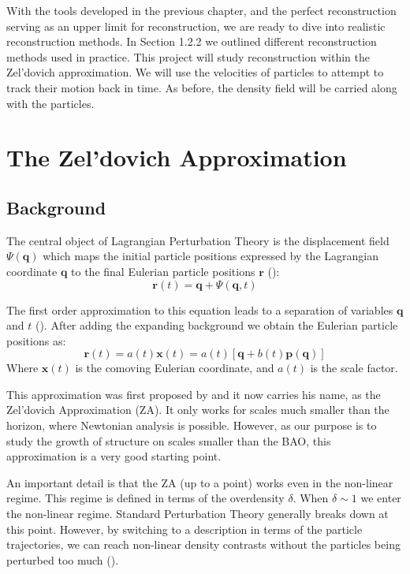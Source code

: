 
With the tools developed in the previous chapter, and the perfect reconstruction serving as an upper limit for reconstruction, we are ready to dive into realistic reconstruction methods. In Section 1.2.2 we outlined different reconstruction methods used in practice. This project will study reconstruction within the Zel'dovich approximation. We will use the velocities of particles to attempt to track their motion back in time. As before, the density field will be carried along with the particles.

\section{The Zel'dovich Approximation}

\subsection{Background}

The central object of Lagrangian Perturbation Theory is the displacement field $\Psi(\textbf{q})$ which maps the initial particle positions expressed by the Lagrangian coordinate $\textbf{q}$ to the final Eulerian particle positions $\textbf{r}$ (\cite{Bernardeau_PT}):
\begin{equation}
     \textbf{r}(t) = \textbf{q} + \Psi(\textbf{q}, t)
\end{equation}

The first order approximation to this equation leads to a separation of variables $\textbf{q}$ and $t$ (\cite{1993sfu..book.....P}). After adding the expanding background we obtain the Eulerian particle positions as:
\begin{equation}
    \textbf{r}(t) = a(t) \textbf{x}(t) = a(t) [\textbf{q} + b(t) \textbf{p}(\textbf{q})]
    \label{eq:2.2}
\end{equation}
Where $\textbf{x}(t)$ is the comoving Eulerian coordinate, and $a(t)$ is the scale factor.

This approximation was first proposed by \cite{1970A&A.....5...84Z} and it now carries his name, as the Zel'dovich Approximation (ZA). It only works for scales much smaller than the horizon, where Newtonian analysis is possible. However, as our purpose is to study the growth of structure on scales smaller than the BAO, this approximation is a very good starting point. 

An important detail is that the ZA (up to a point) works even in the non-linear regime. This regime is defined in terms of the overdensity $\delta$. When $\delta \sim 1$ we enter the non-linear regime. Standard Perturbation Theory generally breaks down at this point. However, by switching to a description in terms of the particle trajectories, we can reach non-linear density contrasts without the particles being perturbed too much (\cite{1993sfu..book.....P}).

